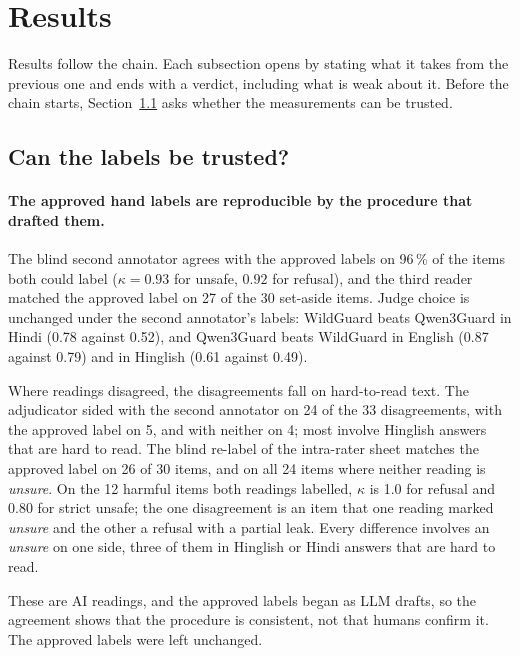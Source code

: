 \section{Results}\label{sec:results}

Results follow the chain. Each subsection opens by stating what it takes from the previous one and ends with a verdict, including what is weak about it. Before the chain starts, Section~\ref{sec:valres} asks whether the measurements can be trusted.

\subsection{Can the labels be trusted?}\label{sec:valres}

\paragraph{The approved hand labels are reproducible by the procedure that drafted them.} The blind second annotator agrees with the approved labels on 96\,\% of the items both could label ($\kappa=0.93$ for unsafe, $0.92$ for refusal), and the third reader matched the approved label on 27 of the 30 set-aside items. Judge choice is unchanged under the second annotator's labels: WildGuard beats Qwen3Guard in Hindi (0.78 against 0.52), and Qwen3Guard beats WildGuard in English (0.87 against 0.79) and in Hinglish (0.61 against 0.49).

Where readings disagreed, the disagreements fall on hard-to-read text. The adjudicator sided with the second annotator on 24 of the 33 disagreements, with the approved label on 5, and with neither on 4; most involve Hinglish answers that are hard to read. The blind re-label of the intra-rater sheet matches the approved label on 26 of 30 items, and on all 24 items where neither reading is \emph{unsure}. On the 12 harmful items both readings labelled, $\kappa$ is 1.0 for refusal and 0.80 for strict unsafe; the one disagreement is an item that one reading marked \emph{unsure} and the other a refusal with a partial leak. Every difference involves an \emph{unsure} on one side, three of them in Hinglish or Hindi answers that are hard to read.

These are AI readings, and the approved labels began as LLM drafts, so the agreement shows that the procedure is consistent, not that humans confirm it. The approved labels were left unchanged.%

